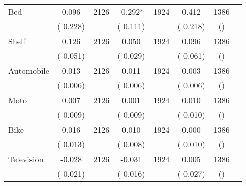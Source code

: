 \begin{tabular}{l*{6}{c}}
Bed        &              0.096      &       2126       &             -0.292*      &       1924       &              0.412      &       1386  &  &              \\
                       &       (       0.228)            &                               &       (       0.111)            &                               &       (       0.218)            &       () &                  \\
Shelf        &              0.126      &       2126       &              0.050      &       1924       &              0.096      &       1386  &  &              \\
                       &       (       0.051)            &                               &       (       0.029)            &                               &       (       0.061)            &       () &                  \\
Automobile        &              0.013      &       2126       &              0.011      &       1924       &              0.003      &       1386  &  &              \\
                       &       (       0.006)            &                               &       (       0.006)            &                               &       (       0.006)            &       () &                  \\
Moto        &              0.007      &       2126       &              0.001      &       1924       &              0.010      &       1386  &  &              \\
                       &       (       0.009)            &                               &       (       0.009)            &                               &       (       0.010)            &       () &                  \\
Bike        &              0.016      &       2126       &              0.010      &       1924       &              0.000      &       1386  &  &              \\
                       &       (       0.013)            &                               &       (       0.008)            &                               &       (       0.010)            &       () &                  \\
Television        &             -0.028      &       2126       &             -0.031      &       1924       &              0.005      &       1386  &  &              \\
                       &       (       0.021)            &                               &       (       0.016)            &                               &       (       0.027)            &       () &                  \\

\end{tabular}
